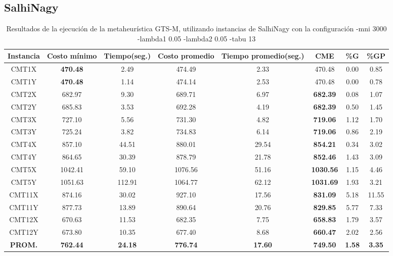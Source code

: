 \clearpage
\subsection{SalhiNagy}\label{tablas-entonacion-GTS-M-salhinagy}

\begin{table}[h]
\caption{Resultados de la ejecución de la metaheurística GTS-M, utilizando instancias de SalhiNagy con la configuración -mni 3000 -lambda1 0.05 -lambda2 0.05 -tabu 13}
\centering
\small
\begin{tabular}{c c c c c c c c}
\hline\hline
Instancia & Costo mínimo & Tiempo(seg.) & Costo promedio & Tiempo promedio(seg.) & CME & \%G & \%GP \\ [0.5ex]
\hline
CMT1X & \bf{470.48} & 2.49 & 
474.49 & 2.33 & 470.48 & 0.00
 & 0.85\\CMT1Y & \bf{470.48} & 1.14 & 
474.14 & 2.53 & 470.48 & 0.00
 & 0.78\\CMT2X & 682.97 & 9.30 & 
689.71 & 6.97 & \bf{682.39} & 
0.08 & 1.07\\CMT2Y & 685.83 & 3.53 & 
692.28 & 4.19 & \bf{682.39} & 
0.50 & 1.45\\CMT3X & 727.10 & 5.56 & 
731.30 & 4.82 & \bf{719.06} & 
1.12 & 1.70\\CMT3Y & 725.24 & 3.82 & 
734.83 & 6.14 & \bf{719.06} & 
0.86 & 2.19\\CMT4X & 857.10 & 44.51 & 
880.01 & 29.54 & \bf{854.21} & 
0.34 & 3.02\\CMT4Y & 864.65 & 30.39 & 
878.79 & 21.78 & \bf{852.46} & 
1.43 & 3.09\\CMT5X & 1042.41 & 59.10 & 
1076.56 & 51.16 & \bf{1030.56} & 
1.15 & 4.46\\CMT5Y & 1051.63 & 112.91 & 
1064.77 & 62.12 & \bf{1031.69} & 
1.93 & 3.21\\CMT11X & 874.16 & 30.02 & 
927.10 & 17.56 & \bf{831.09} & 
5.18 & 11.55\\CMT11Y & 877.73 & 13.89 & 
890.64 & 20.76 & \bf{829.85} & 
5.77 & 7.33\\CMT12X & 670.63 & 11.53 & 
682.35 & 7.75 & \bf{658.83} & 
1.79 & 3.57\\CMT12Y & 673.80 & 10.35 & 
677.40 & 8.68 & \bf{660.47} & 
2.02 & 2.56\\\bf{PROM.} & 
\bf{762.44} & \bf{24.18} & \bf{776.74} & \bf{17.60} & \bf{749.50} & \bf{1.58} & \bf{3.35}\\[1ex]\hline
\end{tabular}
\label{table:nonlin}
\end{table}
